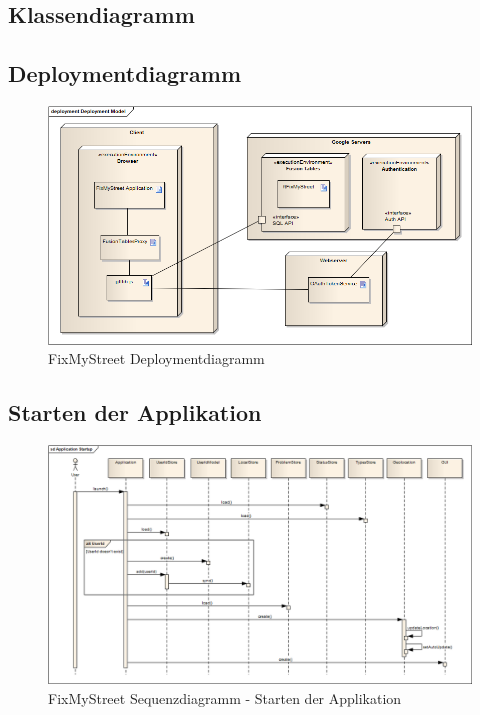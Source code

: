 \subsection{Klassendiagramm}

\subsection{Deploymentdiagramm}

\begin{figure}[h!]
	\centering
	\includegraphics[scale=0.5]{images/usecase2-fixmystreet/uml/fixmystreet-deploymentmodel.png}
	\caption{FixMyStreet Deploymentdiagramm}
	\label{fixmystreet-deploymentmodel}
\end{figure}

\subsection{Starten der Applikation}

\begin{figure}[h!]
	\centering
	\includegraphics[scale=0.45]{images/usecase2-fixmystreet/uml/fixmystreet-sequencediagram-applicationstartup.png}
	\caption{FixMyStreet Sequenzdiagramm - Starten der Applikation}
	\label{fixmystreet-sequencediagram-applicationstartup}
\end{figure}

